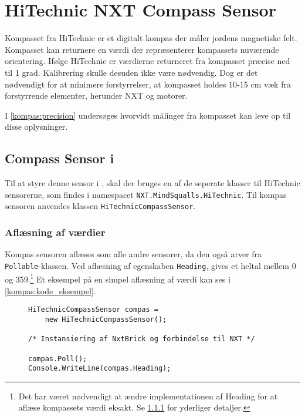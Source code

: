\section{HiTechnic NXT Compass Sensor}
Kompasset fra HiTechnic er et digitalt kompas der måler jordens magnetiske felt.
Kompasset kan returnere en værdi der repræsenterer kompassets nuværende orientering.
Ifølge HiTechnic er værdierne returneret fra kompasset præcise ned til 1 grad.
Kalibrering skulle desuden ikke være nødvendig.
Dog er det nødvendigt for at minimere forstyrrelser, at kompasset holdes 10-15 cm væk fra forstyrrende elementer, herunder \lego NXT og motorer.\cite{hitechnic_compass}

I \cref{kompas:precision} undersøges hvorvidt målinger fra kompasset kan leve op til disse oplysninger.

\subsection{Compass Sensor i \mindsqualls}
Til at styre denne sensor i \mindsqualls, skal der bruges en af de seperate klasser til HiTechnic sensorerne, som findes i namespacet \lstinline[style=csharp]!NXT.MindSqualls.HiTechnic!.
Til kompas sensoren anvendes klassen \lstinline[style=csharp]!HiTechnicCompassSensor!.

\subsubsection{Aflæsning af værdier}
Kompas sensoren aflæses som alle andre sensorer, da den også arver fra \lstinline[style=csharp]!Pollable!-klassen.
Ved aflæsning af egenskaben \lstinline[style=csharp]!Heading!, gives et heltal mellem 0 og 359.\footnote{Det har været nødvendigt at ændre implementationen af Heading for at aflæse kompassets værdi eksakt.
Se \cref{} for yderliger detaljer.}
Et eksempel på en simpel aflæsning af værdi kan ses i \cref{kompas:kode_eksempel}.

\begin{figure}[h]
\begin{lstlisting}[style=csharpsmall,caption={Et eksempel på brug af Compass Sensor},label=kompas:kode_eksempel,frame=single]
HiTechnicCompassSensor compas =
	new HiTechnicCompassSensor();
	
/* Instansiering af NxtBrick og forbindelse til NXT */

compas.Poll();
Console.WriteLine(compas.Heading);
\end{lstlisting}
\end{figure}

